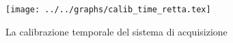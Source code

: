 \begin{figure}[h] \centering\texttt{[image: ../../graphs/calib\_time\_retta.tex]}\caption{La calibrazione temporale del sistema di acquisizione }\label{gr:calib_time_retta} \end{figure}
